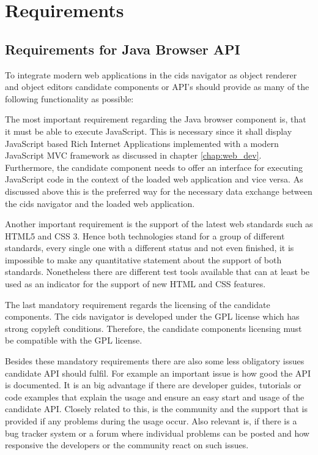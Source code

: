 \section{Requirements}\label{chap:requirements}
\subsection{Requirements for Java Browser API}

To integrate modern web applications in the cids navigator as object renderer and object editors candidate components or API's should provide as many of the following functionality as possible:

The most important requirement regarding the Java browser component is, that it must be able to execute JavaScript.
This is necessary since it shall display JavaScript based Rich Internet Applications implemented with a modern JavaScript MVC framework as discussed in chapter \ref{chap:web_dev}.
Furthermore, the candidate component needs to offer an interface for executing JavaScript code in the context of the loaded web application and vice versa.
As discussed above this is the preferred way for the necessary data exchange between the cids navigator and the  loaded web application.

Another important requirement is the support of the latest web standards such as HTML5 and CSS 3.
Hence both technologies stand for a group of different standards, every single one with a different status and not even finished, it is impossible to make any quantitative statement about the support of both standards.
Nonetheless there are different test tools available that can at least be used as an indicator for the support of new HTML and CSS features.

The last mandatory requirement regards the licensing of the candidate components.
The cids navigator is developed under the GPL license which has strong copyleft conditions.
Therefore, the candidate components licensing must be compatible with the GPL license.

Besides these mandatory requirements there are also some less obligatory issues candidate API should fulfil.
For example an important issue is how good the API is documented.
It is an big advantage if there are developer guides, tutorials or code examples that explain the usage and ensure an easy start and usage of the candidate API.
Closely related to this, is the community and the support that is provided if any problems during the usage occur.
Also relevant is, if there is a bug tracker system or a forum where individual problems can be posted and how responsive the developers or the community react on such issues.

